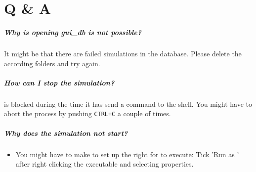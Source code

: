 \chapter{Q \& A}

\paragraph{Why is opening gui\_db is not possible?} It might be that there are failed simulations in the
database. Please delete the according folders and try again.

\paragraph{How can I stop the simulation?} \matlab is blocked during
the time it has send a command to the shell. You might have to abort the process by pushing \verb|CTRL+C|
a couple of times.

\paragraph{Why does the simulation not start?}
	\begin{itemize}
		\item You might have to make to set up the right for \omen to execute: Tick 'Run as ' after right clicking
					the \omen executable and selecting properties.
	\end{itemize}